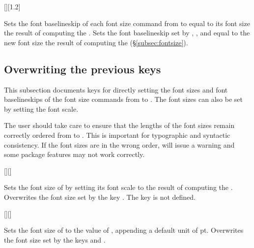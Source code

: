 \documentclass{beery}
\begin{document}
\begin{mydisplaycode}
  [][1.2]
\end{mydisplaycode}

Sets the font baselineskip of each font size command from  to  equal to its font size \texttimes{} the result of computing the .
Sets the font baselineskip set by , , and  equal to the new font size \texttimes{} the result of computing the  (\S\ref{subsec:fontsize}).


\subsection{Overwriting the previous keys}
\label{subsec:overwriting}

This subsection documents keys for directly setting the font sizes and font baselineskips of the font size commands from  to .
The font sizes can also be set by setting the font scale.

The user should take care to ensure that the lengths of the font sizes remain correctly ordered from  to .
This is important for typographic and syntactic consistency.
If the font sizes are in the wrong order,  will issue a warning and some package features may not work correctly.
\pagebreak%

\begin{mydisplaycode}
  [][]
\end{mydisplaycode}

Sets the font size of  by setting its font scale to the result of computing the .
Overwrites the font size set by the key .
The key  is not defined.

\begin{mydisplaycode}
  [][]
\end{mydisplaycode}

Sets the font size of  to the value of , appending a default unit of \unit{pt}.
Overwrites the font size set by the keys  and .
\end{document}
